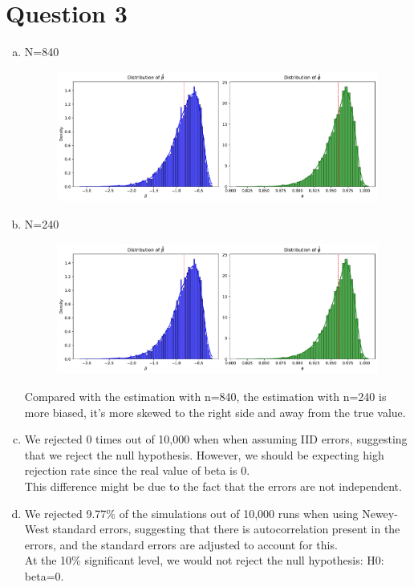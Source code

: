 
\section*{Question 3}

\begin{enumerate}[(a)]
    \item
    N=840\\
    \begin{figure}[h]
        \centering
        \includegraphics[width=0.9\linewidth]{Out/EX3-1.pdf}
        
    \end{figure}

  \item
    N=240\\
    \begin{figure}[h]
        \centering
        \includegraphics[width=0.9\linewidth]{Out/EX3-2.pdf}
        
    \end{figure}
Compared with the estimation with n=840, the estimation with n=240 is more biased, it's more skewed to the right side and away from the true value.
\item 
We rejected 0 times out of 10,000 when when assuming IID errors, 
suggesting that we reject the null hypothesis. 
However, we should be expecting high rejection rate since the real value of beta is 0.\\
This difference might be due to the fact that the errors are not independent.\\

\item 
We rejected 9.77\% of the simulations out of 10,000 runs when using Newey-West standard errors, suggesting that there is autocorrelation present in the errors, and the standard errors are adjusted to account for this.\\
At the 10\% significant level, we would not reject the null hypothesis: H0: beta=0. 
\end{enumerate}

